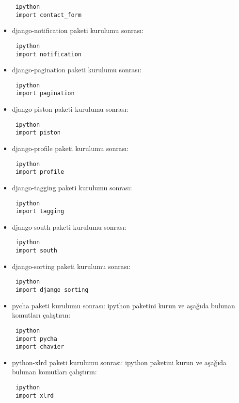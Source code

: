 \documentclass[a4paper,10pt]{article}
\begin{document}
\begin{itemize}
\begin{verbatim}
 ipython
 import contact_form
\end{verbatim}

\item django-notification paketi kurulumu sonrası:

\begin{verbatim}
 ipython
 import notification
\end{verbatim}

\item django-pagination paketi kurulumu sonrası:

\begin{verbatim}
 ipython
 import pagination
\end{verbatim}

\item django-piston paketi kurulumu sonrası:

\begin{verbatim}
 ipython
 import piston
\end{verbatim}

\item django-profile paketi kurulumu sonrası:

\begin{verbatim}
 ipython
 import profile
\end{verbatim}

\item django-tagging paketi kurulumu sonrası:
\begin{verbatim}
 ipython
 import tagging
\end{verbatim}

\item django-south paketi kurulumu sonrası:
\begin{verbatim}
 ipython
 import south
\end{verbatim}

\item django-sorting paketi kurulumu sonrası:

\begin{verbatim}
 ipython
 import django_sorting
\end{verbatim}

\item pycha paketi kurulumu sonrası:
ipython paketini kurun ve aşağıda bulunan komutları çalıştırın:
\begin{verbatim}
 ipython
 import pycha
 import chavier
\end{verbatim}

\item python-xlrd paketi kurulumu sonrası:
ipython paketini kurun ve aşağıda bulunan komutları çalıştırın:
\begin{verbatim}
 ipython
 import xlrd
\end{verbatim}


\end{itemize}
\end{document}
